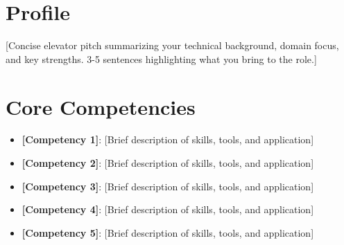 \documentclass[11pt,a4paper,sans]{moderncv}
\begin{document}
\makecvtitle

\section{Profile}
[Concise elevator pitch summarizing your technical background, domain focus, and key strengths. 3-5 sentences highlighting what you bring to the role.]

\section{Core Competencies}
\begin{itemize}
\item \textbf{[Competency 1]}: [Brief description of skills, tools, and application]
\item \textbf{[Competency 2]}: [Brief description of skills, tools, and application]
\item \textbf{[Competency 3]}: [Brief description of skills, tools, and application]
\item \textbf{[Competency 4]}: [Brief description of skills, tools, and application]
\item \textbf{[Competency 5]}: [Brief description of skills, tools, and application]
\end{itemize}
\end{document}
